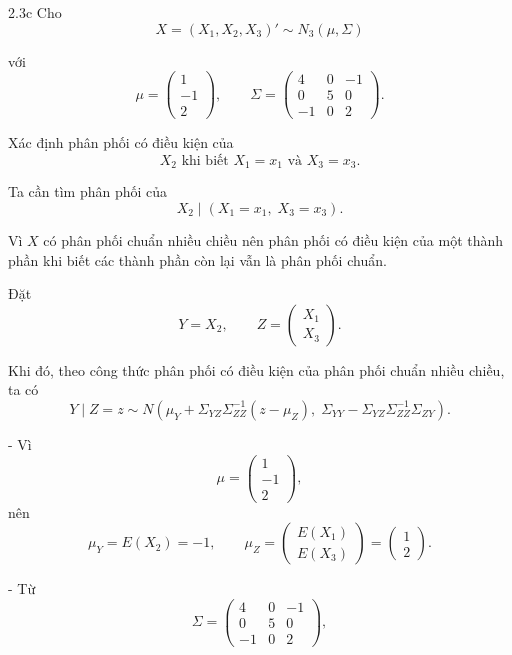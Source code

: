 \begin{question}{2.3c}
Cho
\[
X = (X_1, X_2, X_3)' \sim N_3(\mu, \Sigma)
\]

với
\[
\mu =
\begin{pmatrix}
1\\
-1\\
2
\end{pmatrix},
\qquad
\Sigma =
\begin{pmatrix}
4 & 0 & -1\\
0 & 5 & 0\\
-1 & 0 & 2
\end{pmatrix}.
\]

Xác định phân phối có điều kiện của
\[
X_2 \text{ khi biết } X_1 = x_1 \text{ và } X_3 = x_3.
\]

\begin{answer}
Ta cần tìm phân phối của
\[
X_2 \mid (X_1 = x_1,\; X_3 = x_3).
\]

Vì $X$ có phân phối chuẩn nhiều chiều nên phân phối có điều kiện của một thành phần khi biết các thành phần còn lại vẫn là phân phối chuẩn.

Đặt
\[
Y = X_2, \qquad
Z =
\begin{pmatrix}
X_1 \\
X_3
\end{pmatrix}.
\]

Khi đó, theo công thức phân phối có điều kiện của phân phối chuẩn nhiều chiều, ta có
\[
Y \mid Z = z \sim N\left(
\mu_Y + \Sigma_{YZ}\Sigma_{ZZ}^{-1}(z - \mu_Z),\;
\Sigma_{YY} - \Sigma_{YZ}\Sigma_{ZZ}^{-1}\Sigma_{ZY}
\right).
\]

- Vì
\[
\mu =
\begin{pmatrix}
1\\
-1\\
2
\end{pmatrix},
\]
nên
\[
\mu_Y = E(X_2) = -1, \qquad
\mu_Z =
\begin{pmatrix}
E(X_1)\\
E(X_3)
\end{pmatrix}
=
\begin{pmatrix}
1\\
2
\end{pmatrix}.
\]

- Từ
\[
\Sigma =
\begin{pmatrix}
4 & 0 & -1\\
0 & 5 & 0\\
-1 & 0 & 2
\end{pmatrix},
\]


\end{answer}
\end{question}
